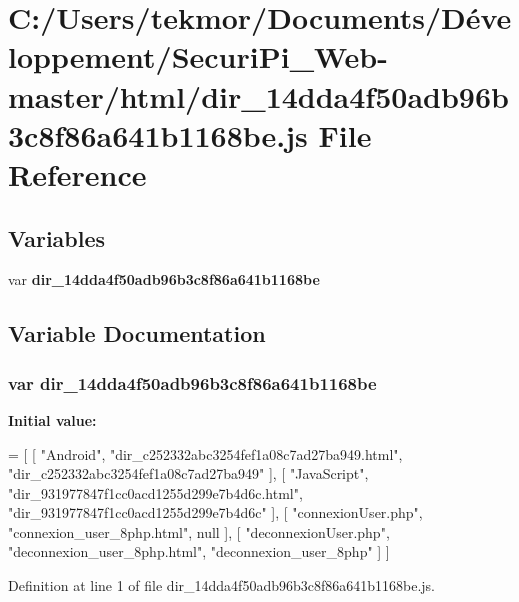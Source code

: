 \section{C\+:/\+Users/tekmor/\+Documents/\+Développement/\+Securi\+Pi\+\_\+\+Web-\/master/html/dir\+\_\+14dda4f50adb96b3c8f86a641b1168be.js File Reference}
\label{dir__14dda4f50adb96b3c8f86a641b1168be_8js}
\subsection*{Variables}
\begin{DoxyCompactItemize}
\item 
var {\bf dir\+\_\+14dda4f50adb96b3c8f86a641b1168be}
\end{DoxyCompactItemize}


\subsection{Variable Documentation}
\subsubsection[{dir\+\_\+14dda4f50adb96b3c8f86a641b1168be}]{\setlength{\rightskip}{0pt plus 5cm}var dir\+\_\+14dda4f50adb96b3c8f86a641b1168be}\label{dir__14dda4f50adb96b3c8f86a641b1168be_8js_aa649d693323191b84a510aff330cbafc}
{\bfseries Initial value\+:}
\begin{DoxyCode}
=
[
    [ \textcolor{stringliteral}{"Android"}, \textcolor{stringliteral}{"dir\_c252332abc3254fef1a08c7ad27ba949.html"}, \textcolor{stringliteral}{"dir\_c252332abc3254fef1a08c7ad27ba949"} ],
    [ \textcolor{stringliteral}{"JavaScript"}, \textcolor{stringliteral}{"dir\_931977847f1cc0acd1255d299e7b4d6c.html"}, \textcolor{stringliteral}{"dir\_931977847f1cc0acd1255d299e7b4d6c"} ],
    [ \textcolor{stringliteral}{"connexionUser.php"}, \textcolor{stringliteral}{"connexion\_user\_8php.html"}, null ],
    [ \textcolor{stringliteral}{"deconnexionUser.php"}, \textcolor{stringliteral}{"deconnexion\_user\_8php.html"}, \textcolor{stringliteral}{"deconnexion\_user\_8php"} ]
]
\end{DoxyCode}


Definition at line 1 of file dir\+\_\+14dda4f50adb96b3c8f86a641b1168be.\+js.

